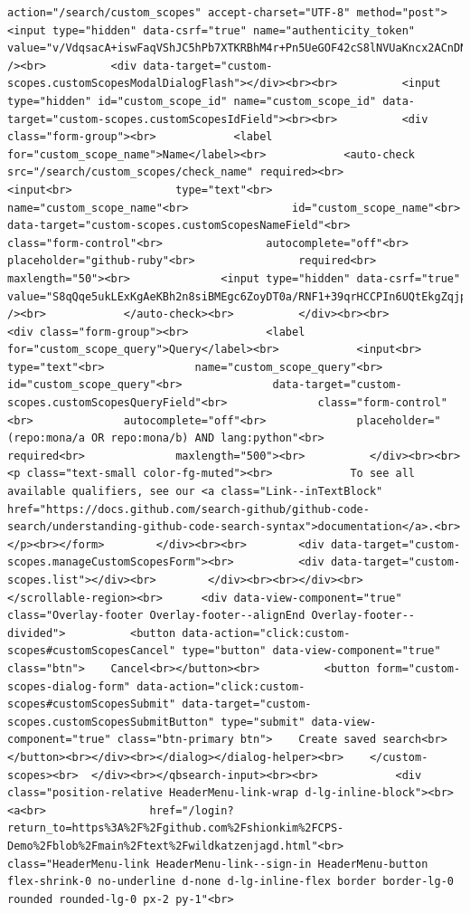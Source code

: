 \documentclass[
  letterpaper,
]{book}
\begin{document}
\begin{verbatim}
action="/search/custom_scopes" accept-charset="UTF-8" method="post"><input type="hidden" data-csrf="true" name="authenticity_token" value="v/VdqsacA+iswFaqVShJC5hPb7XTKRBhM4r+Pn5UeGOF42cS8lNVUaKncx2ACnDNPaQIIw5l/LtFBV2l6SXvxw==" /><br>          <div data-target="custom-scopes.customScopesModalDialogFlash"></div><br><br>          <input type="hidden" id="custom_scope_id" name="custom_scope_id" data-target="custom-scopes.customScopesIdField"><br><br>          <div class="form-group"><br>            <label for="custom_scope_name">Name</label><br>            <auto-check src="/search/custom_scopes/check_name" required><br>              <input<br>                type="text"<br>                name="custom_scope_name"<br>                id="custom_scope_name"<br>                data-target="custom-scopes.customScopesNameField"<br>                class="form-control"<br>                autocomplete="off"<br>                placeholder="github-ruby"<br>                required<br>                maxlength="50"><br>              <input type="hidden" data-csrf="true" value="S8qQqe5ukLExKgAeKBh2n8siBMEgc6ZoyDT0a/RNF1+39qrHCCPIn6UQtEkgZqjpt8CmiGo8OsQMu4U8y1BbBQ==" /><br>            </auto-check><br>          </div><br><br>          <div class="form-group"><br>            <label for="custom_scope_query">Query</label><br>            <input<br>              type="text"<br>              name="custom_scope_query"<br>              id="custom_scope_query"<br>              data-target="custom-scopes.customScopesQueryField"<br>              class="form-control"<br>              autocomplete="off"<br>              placeholder="(repo:mona/a OR repo:mona/b) AND lang:python"<br>              required<br>              maxlength="500"><br>          </div><br><br>          <p class="text-small color-fg-muted"><br>            To see all available qualifiers, see our <a class="Link--inTextBlock" href="https://docs.github.com/search-github/github-code-search/understanding-github-code-search-syntax">documentation</a>.<br>          </p><br></form>        </div><br><br>        <div data-target="custom-scopes.manageCustomScopesForm"><br>          <div data-target="custom-scopes.list"></div><br>        </div><br><br></div><br>      </scrollable-region><br>      <div data-view-component="true" class="Overlay-footer Overlay-footer--alignEnd Overlay-footer--divided">          <button data-action="click:custom-scopes#customScopesCancel" type="button" data-view-component="true" class="btn">    Cancel<br></button><br>          <button form="custom-scopes-dialog-form" data-action="click:custom-scopes#customScopesSubmit" data-target="custom-scopes.customScopesSubmitButton" type="submit" data-view-component="true" class="btn-primary btn">    Create saved search<br></button><br></div><br></dialog></dialog-helper><br>    </custom-scopes><br>  </div><br></qbsearch-input><br><br>            <div class="position-relative HeaderMenu-link-wrap d-lg-inline-block"><br>              <a<br>                href="/login?return_to=https%3A%2F%2Fgithub.com%2Fshionkim%2FCPS-Demo%2Fblob%2Fmain%2Ftext%2Fwildkatzenjagd.html"<br>                class="HeaderMenu-link HeaderMenu-link--sign-in HeaderMenu-button flex-shrink-0 no-underline d-none d-lg-inline-flex border border-lg-0 rounded rounded-lg-0 px-2 py-1"<br>           
\end{verbatim}
\end{document}
